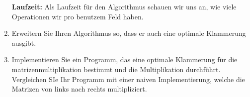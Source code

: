 \documentclass[11pt,a4paper,ngerman]{article}
\begin{document}
\begin{enumerate}[\bfseries (a)]
\textbf{Laufzeit:} Als Laufzeit für den Algorithmus schauen wir uns an, wie viele Operationen wir pro benutzem Feld haben.\\


\item Erweitern Sie Ihren Algorithmus so, dass er auch eine optimale Klammerung ausgibt.\\


\item Implementieren Sie ein Programm, das eine optimale Klammerung für die matrizenmultiplikation bestimmt und die Multiplikation durchführt. Vergleichen SIe Ihr Programm mit einer naiven Implementierung, welche die Matrizen von links nach rechts multipliziert.

\end{enumerate}

\label{LastPage}
\end{document}

